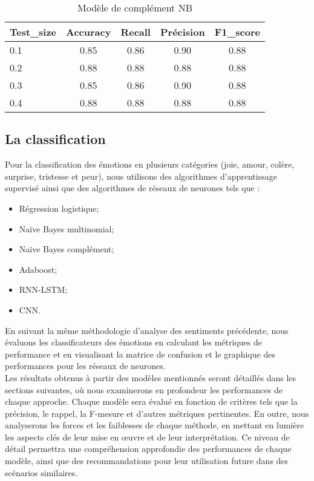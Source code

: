 \begin{table}[h!]
    \centering
    \caption{Modèle de complément NB }
    \begin{tabular}{lcccc}
        \toprule
        Test\_size & Accuracy & Recall & Précision & F1\_score \\
        \midrule
        0.1 & 0.85 & 0.86 & 0.90 & 0.88 \\
        0.2 & 0.88 & 0.88 & 0.88 & 0.88 \\
        0.3 & 0.85 & 0.86 & 0.90 & 0.88 \\
        0.4 & 0.88 & 0.88 & 0.88 & 0.88 \\
        \bottomrule
    \end{tabular}
\end{table}

\subsection{La classification}
Pour la classification des émotions en plusieurs catégories (joie, amour, colère, surprise, tristesse et peur), nous utilisons des algorithmes d'apprentissage supervisé ainsi que des algorithmes de réseaux de neurones tels que :
\begin{itemize}
    \item Régression logistique;
    \item Naïve Bayes multinomial;
    \item Naïve Bayes complément;
    \item Adaboost;
    \item RNN-LSTM;
    \item CNN.
\end{itemize}
En suivant la même méthodologie d’analyse des sentiments précédente, nous évaluons les classificateurs des émotions en calculant les métriques de performance et en visualisant la matrice de confusion et le graphique des performances pour les réseaux de neurones. \\
Les résultats obtenus à partir des modèles mentionnés seront détaillés dans les sections suivantes, où nous examinerons en profondeur les performances de chaque approche. Chaque modèle sera évalué en fonction de critères tels que la précision, le rappel, la F-mesure et d'autres métriques pertinentes. En outre, nous analyserons les forces et les faiblesses de chaque méthode, en mettant en lumière les aspects clés de leur mise en œuvre et de leur interprétation. Ce niveau de détail permettra une compréhension approfondie des performances de chaque modèle, ainsi que des recommandations pour leur utilisation future dans des scénarios similaires.


